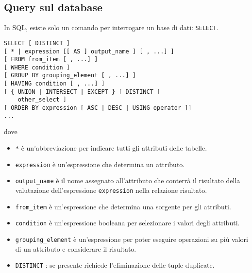 \documentclass[a4paper, 10pt]{article}
\begin{document}
	\subsection{Query sul database}
		In SQL, esiste solo un comando per interrogare un base di dati: \lstinline|SELECT|.
		\begin{lstlisting}
SELECT [ DISTINCT ]
[ * | expression [[ AS ] output_name ] [ , ...] ]
[ FROM from_item [ , ...] ]
[ WHERE condition ]
[ GROUP BY grouping_element [ , ...] ]
[ HAVING condition [ , ...] ]
[ { UNION | INTERSECT | EXCEPT } [ DISTINCT ]
	other_select ]
[ ORDER BY expression [ ASC | DESC | USING operator ]]
...
		\end{lstlisting}
		dove
		\begin{itemize}
			\item \lstinline|*| è un’abbreviazione per indicare tutti gli attributi delle tabelle.
			\item \lstinline|expression| è un’espressione che determina un attributo.
			\item \lstinline|output_name| è il nome assegnato all’attributo che conterrà il risultato
			della valutazione dell’espressione \lstinline|expression| nella relazione risultato.
			\item \lstinline|from_item| è un’espressione che determina una sorgente per gli attributi.
			\item \lstinline|condition| è un’espressione booleana per selezionare i valori degli
			attributi.
			\item \lstinline|grouping_element| è un’espressione per poter eseguire operazioni su
			più valori di un attributo e considerare il risultato.
			\item \lstinline|DISTINCT| : se presente richiede l’eliminazione delle tuple duplicate.
		\end{itemize}
		
\end{document}
